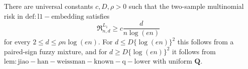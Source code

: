 There are universal constants \(c,D,\rho>0\) such that the two-sample multinomial risk in \(\mathrm{def:l1-embedding}\) satisfies
\[
 \mathfrak R^{L_1}_{n,d}\geq c\frac{d}{n\log(en)}
\]
for every \(2\leq d\leq\rho n\log(en)\).  For \(d\leq D\{\log(en)\}^2\) this follows from a paired-sign fuzzy mixture, and for \(d\geq D\{\log(en)\}^2\) it follows from \(\mathrm{lem:jiao-han-weissman-known-q-lower}\) with uniform \(\mathbf Q\).